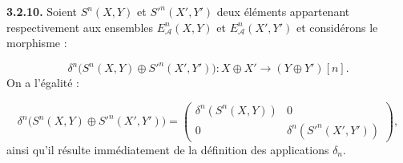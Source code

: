 \medskip\noindent\textbf{3.2.10.}\quad
Soient $S^n(X,Y)$ et ${S'}^n(X',Y')$ deux éléments appartenant
respectivement aux ensembles $E_{\mathcal A}^{n}(X,Y)$ et
$E_{\mathcal A}^{n}(X',Y')$ et considérons le morphisme :

\[
\delta^n\bigl(S^n(X,Y)\oplus {S'}^n(X',Y')\bigr)
\colon X\oplus X'\longrightarrow (Y\oplus Y')[n].
\]
On a l'égalité :

\begin{equation}
\delta^n\bigl(S^n(X,Y)\oplus {S'}^n(X',Y')\bigr)
=
\begin{pmatrix}
\delta^n(S^n(X,Y))&0\\
0&\delta^n({S'}^n(X',Y'))
\end{pmatrix},
\tag{3.2.10.1}
\end{equation}
ainsi qu'il résulte immédiatement de la définition des applications
$\delta_n$.
\endgroup

